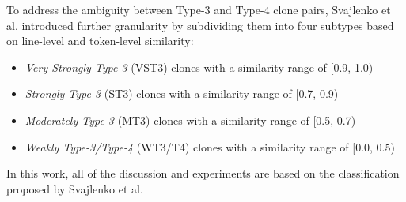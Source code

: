 To address the ambiguity between Type-3 and Type-4 clone pairs, Svajlenko et al. \cite{svajlenko2014big} introduced further granularity by subdividing them into four subtypes based on line-level and token-level similarity: 
\begin{itemize}
    \item \emph{Very Strongly Type-3} (VST3) clones with a similarity range of [0.9, 1.0)
    \item \emph{Strongly Type-3} (ST3) clones with a similarity range of [0.7, 0.9)
    \item \emph{Moderately Type-3} (MT3) clones with a similarity range of [0.5, 0.7) 
    \item \emph{Weakly Type-3/Type-4} (WT3/T4) clones with a similarity range of [0.0, 0.5)
\end{itemize}
In this work, all of the discussion and experiments are based on the classification proposed by Svajlenko et al.~\cite{svajlenko2014big}


